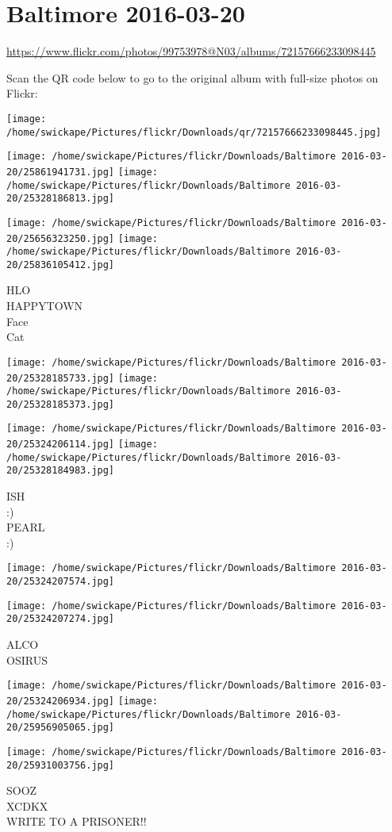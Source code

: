 \documentclass[10pt,letterpaper]{article}
\title{}
\author{}
\date{}
\begin{document}
\section*{Baltimore 2016-03-20}

\url{https://www.flickr.com/photos/99753978@N03/albums/72157666233098445}

Scan the QR code below to go to the original album with full-size photos on Flickr:

\texttt{[image: /home/swickape/Pictures/flickr/Downloads/qr/72157666233098445.jpg]}
\pagebreak

\texttt{[image: /home/swickape/Pictures/flickr/Downloads/Baltimore 2016-03-20/25861941731.jpg]}
\texttt{[image: /home/swickape/Pictures/flickr/Downloads/Baltimore 2016-03-20/25328186813.jpg]}

\texttt{[image: /home/swickape/Pictures/flickr/Downloads/Baltimore 2016-03-20/25656323250.jpg]}
\texttt{[image: /home/swickape/Pictures/flickr/Downloads/Baltimore 2016-03-20/25836105412.jpg]}

HLO\\
HAPPYTOWN\\
Face\\
Cat
\pagebreak

\texttt{[image: /home/swickape/Pictures/flickr/Downloads/Baltimore 2016-03-20/25328185733.jpg]}
\texttt{[image: /home/swickape/Pictures/flickr/Downloads/Baltimore 2016-03-20/25328185373.jpg]}

\texttt{[image: /home/swickape/Pictures/flickr/Downloads/Baltimore 2016-03-20/25324206114.jpg]}
\texttt{[image: /home/swickape/Pictures/flickr/Downloads/Baltimore 2016-03-20/25328184983.jpg]}

ISH\\
:)\\
PEARL\\
:)
\pagebreak

\texttt{[image: /home/swickape/Pictures/flickr/Downloads/Baltimore 2016-03-20/25324207574.jpg]}

\vspace{0.25in}
\texttt{[image: /home/swickape/Pictures/flickr/Downloads/Baltimore 2016-03-20/25324207274.jpg]}

ALCO\\
OSIRUS
\pagebreak

\texttt{[image: /home/swickape/Pictures/flickr/Downloads/Baltimore 2016-03-20/25324206934.jpg]}
\texttt{[image: /home/swickape/Pictures/flickr/Downloads/Baltimore 2016-03-20/25956905065.jpg]}

\texttt{[image: /home/swickape/Pictures/flickr/Downloads/Baltimore 2016-03-20/25931003756.jpg]}

SOOZ\\
XCDKX\\
WRITE TO A PRISONER!!
\pagebreak
\end{document}
